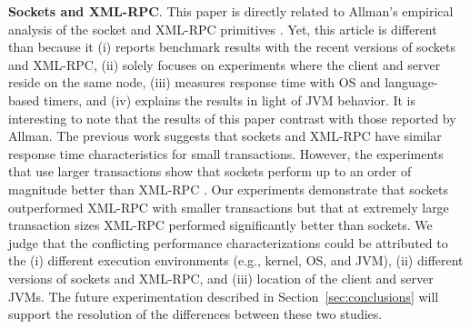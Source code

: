 \documentclass{sig-alternate}
\begin{document}
{\bf Sockets and XML-RPC}. This paper is directly related to Allman's
empirical analysis of the socket and XML-RPC primitives
\cite{allman-per}.  Yet, this article is different than
\cite{allman-per} because it (i) reports benchmark results with the
recent versions of sockets and XML-RPC, (ii) solely focuses on
experiments where the client and server reside on the same node, (iii)
measures response time with OS and language-based timers, and (iv)
explains the results in light of JVM behavior.  It is interesting to
note that the results of this paper contrast with those reported by
Allman.  The previous work suggests that sockets and XML-RPC have
similar response time characteristics for small transactions.
However, the experiments that use larger transactions show that
sockets perform up to an order of magnitude better than XML-RPC
\cite{allman-per}.  Our experiments demonstrate that sockets
outperformed XML-RPC with smaller transactions but that at extremely
large transaction sizes XML-RPC performed significantly better than
sockets.  We judge that the conflicting performance characterizations
could be attributed to the (i) different execution environments (e.g.,
kernel, OS, and JVM), (ii) different versions of sockets and XML-RPC,
and (iii) location of the client and server JVMs.  The future
experimentation described in Section~\ref{sec:conclusions} will
support the resolution of the differences between these two studies.


\end{document}
